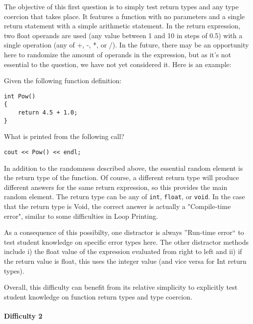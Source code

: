 \documentclass{article}
\begin{document}
The objective of this first question is to simply test return types and any type coercion that takes place. It features a function with no parameters and a single return statement with a simple arithmetic statement. In the return expression, two float operands are used (any value between 1 and 10 in steps of 0.5) with a single operation (any of +, -, *, or /). In the future, there may be an opportunity here to randomize the amount of operands in the expression, but as it's not essential to the question, we have not yet considered it. Here is an example:

\begin{VerbCM}
Given the following function definition:
\end{VerbCM}
\begin{lstlisting}
int Pow() 
{ 
	return 4.5 + 1.0; 
}
\end{lstlisting}
\begin{VerbCM}
What is printed from the following call? 
\end{VerbCM}
\begin{lstlisting}
cout << Pow() << endl; 
\end{lstlisting}

In addition to the randomness described above, the essential random element is the return type of the function. Of course, a different return type will produce different answers for the same return expression, so this provides the main random element. The return type can be any of  \texttt{int}, \texttt{float}, or \texttt{void}. In the case that the return type is Void, the correct
answer is actually a "Compile-time error", similar to some difficulties in Loop Printing. 

As a consequence of this possibilty, one distractor is always ''Run-time error`` to test student knowledge on specific error types here. The other distractor methods include i) the float value
of the expression evaluated from right to left and ii) if the return value is float, this uses the integer value (and vice versa for Int return types).

Overall, this difficulty can benefit from its relative simplicity to explicitly test student knowledge on function return types and type coercion.

\paragraph{Difficulty 2} \hfill \par
\end{document}

